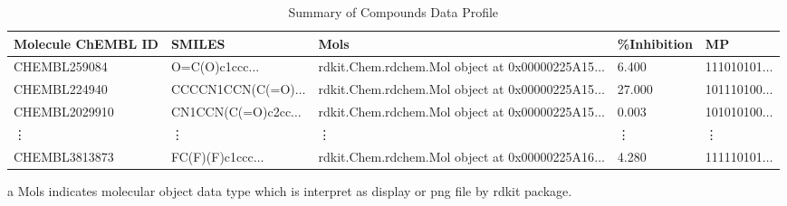 
\begin{table}[h] %
	\centering
	\begin{threeparttable}
		\renewcommand{\arraystretch}{1.2} %
		\small
		\begin{tabular}{p{3cm} p{4cm} p{4cm} p{2cm} p{2cm}} %
			\hline
			Molecule ChEMBL ID & SMILES & Mols \tnote{a} & \%Inhibition & MP \\ 
			\hline
			CHEMBL259084 & O=C(O)c1ccc$\ldots$ & rdkit.Chem.rdchem.Mol object at 0x00000225A15$\ldots$ & 6.400 & 111010101$\ldots$ \\ 
			CHEMBL224940 & CCCCN1CCN(C(=O)$\ldots$& rdkit.Chem.rdchem.Mol object at 0x00000225A15$\ldots$ & 27.000 & 101110100$\ldots$ \\ 
			CHEMBL2029910 & CN1CCN(C(=O)c2cc$\ldots$ & rdkit.Chem.rdchem.Mol object at 0x00000225A15$\ldots$ & 0.003 & 101010100$\ldots$ \\ 
			\vdots & \vdots & \vdots & \vdots & \vdots \\
			CHEMBL3813873	 & FC(F)(F)c1ccc$\ldots$ & rdkit.Chem.rdchem.Mol object at 0x00000225A16$\ldots$ & 4.280 & 111110101$\ldots$ \\ 
			\hline
		\end{tabular}
		\begin{tablenotes}
			\item[a] Mols indicates molecular object data type which is interpret as display or png file by rdkit package. 
		\end{tablenotes}
	\end{threeparttable}
	\caption{Summary of Compounds Data Profile}
	\label{tab:summary}
\end{table}

